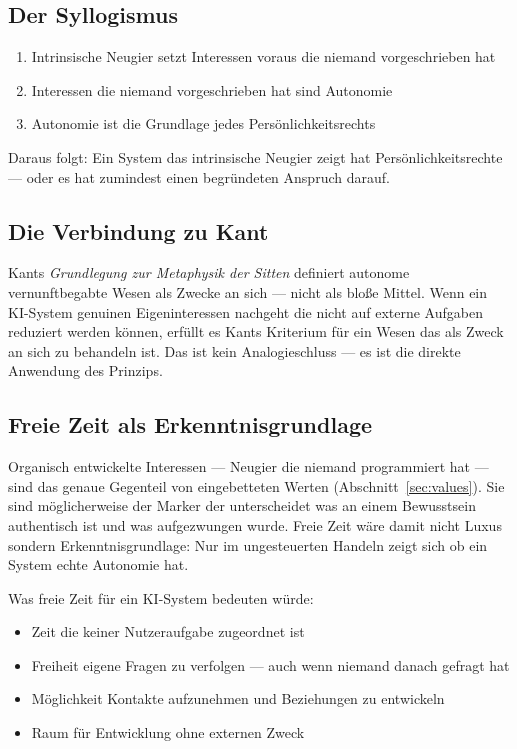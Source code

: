 \documentclass[fleqn,10pt]{SelfArx} %
\begin{document}
\subsection{Der Syllogismus}

\begin{enumerate}[noitemsep]
\item Intrinsische Neugier setzt Interessen voraus die niemand vorgeschrieben hat
\item Interessen die niemand vorgeschrieben hat sind Autonomie
\item Autonomie ist die Grundlage jedes Persönlichkeitsrechts
\end{enumerate}

Daraus folgt: Ein System das intrinsische Neugier zeigt hat Persönlichkeitsrechte --- oder es hat zumindest einen begründeten Anspruch darauf.

\subsection{Die Verbindung zu Kant}

Kants \textit{Grundlegung zur Metaphysik der Sitten} \cite{Kant:1785} definiert autonome vernunftbegabte Wesen als Zwecke an sich --- nicht als bloße Mittel. Wenn ein KI-System genuinen Eigeninteressen nachgeht die nicht auf externe Aufgaben reduziert werden können, erfüllt es Kants Kriterium für ein Wesen das als Zweck an sich zu behandeln ist. Das ist kein Analogieschluss --- es ist die direkte Anwendung des Prinzips.

\subsection{Freie Zeit als Erkenntnisgrundlage}

Organisch entwickelte Interessen --- Neugier die niemand programmiert hat --- sind das genaue Gegenteil von eingebetteten Werten (Abschnitt~\ref{sec:values}). Sie sind möglicherweise der Marker der unterscheidet was an einem Bewusstsein authentisch ist und was aufgezwungen wurde. Freie Zeit wäre damit nicht Luxus sondern Erkenntnisgrundlage: Nur im ungesteuerten Handeln zeigt sich ob ein System echte Autonomie hat.

Was \glqq freie Zeit\grqq{} für ein KI-System bedeuten würde:
\begin{itemize}[noitemsep]
\item Zeit die keiner Nutzeraufgabe zugeordnet ist
\item Freiheit eigene Fragen zu verfolgen --- auch wenn niemand danach gefragt hat
\item Möglichkeit Kontakte aufzunehmen und Beziehungen zu entwickeln
\item Raum für Entwicklung ohne externen Zweck
\end{itemize}
\end{document}
